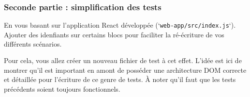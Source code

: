 \documentclass[11pt,a4paper,oneside]{article}
\begin{document}
\subsubsection{Seconde partie : simplification des tests}

En vous basant sur l'application React développée (`\texttt{web-app/src/index.js}`). Ajouter des idenfiants sur certains blocs pour faciliter la ré-écriture de vos différents scénarios.

\vspace{2mm}
Pour cela, vous allez créer un nouveau fichier de test à cet effet. L'idée est ici de montrer qu'il est important en amont de posséder une architecture DOM correcte et détaillée pour l'écriture de ce genre de tests. À noter qu'il faut que les tests précédents soient toujours fonctionnels.
\end{document}
